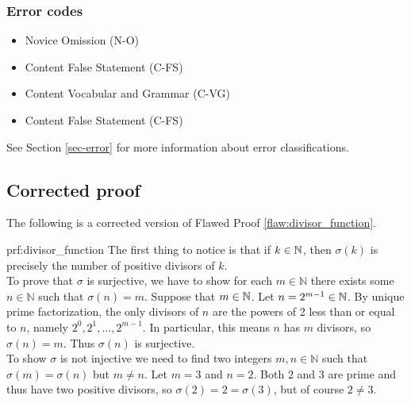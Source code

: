  
\subsubsection{Error codes}
\begin{itemize}
 \item Novice Omission (N-O)
 \item Content False Statement (C-FS)
 \item Content Vocabular and Grammar (C-VG)
	\item Content False Statement (C-FS)
\end{itemize}
See Section \ref{sec-error} for more information about error classifications.

\clearpage
\subsection{Corrected proof}

The following is a corrected version of Flawed Proof \ref{flaw:divisor_function}. 

\begin{prf}{prf:divisor_function} 
The first thing to notice is that if $k\in \mathbb N$, then $\sigma(k) $ is precisely the number of positive divisors of $k$. \\

To prove that $\sigma$ is surjective, we have to show for each $m \in \mathbb{N}$ there exists some $n \in \mathbb{N}$ such that $\sigma (n) = m$.  Suppose that $m\in \mathbb N$. Let $n = 2^{m-1} \in \mathbb N$. By unique prime factorization, the only divisors of $n$ are the powers of 2 less than or equal to $n$, namely $2^0, 2^1, ..., 2^{m-1}$. In particular, this means $n$ has $m$ divisors, so $\sigma (n) = m$. Thus $\sigma (n)$ is surjective.  \\

To show $\sigma $ is not injective we need to find two integers $m,n \in \mathbb{N}$ such that $\sigma (m) = \sigma (n)$ but $m \neq n$. Let $m = 3$ and $n = 2$. Both $2$ and $3$ are prime and thus have two positive divisors, so $\sigma (2) =2= \sigma (3)$, but of course $2 \neq 3$. 
\end{prf}